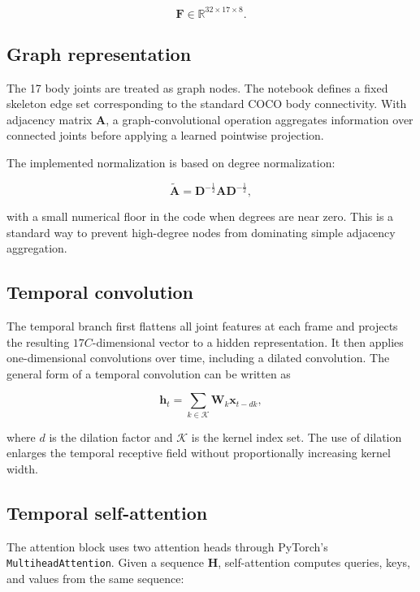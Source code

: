 \documentclass[11pt,a4paper]{article}
\newcommand{\code}[1]{\texttt{#1}}
\newcommand{\R}{\mathbb{R}}
\begin{document}
\begin{equation}
\mathbf{F}\in\R^{32\times17\times8}.
\end{equation}

\subsection{Graph representation}

The 17 body joints are treated as graph nodes. The notebook defines a fixed skeleton edge set corresponding to the standard COCO body connectivity. With adjacency matrix $\mathbf{A}$, a graph-convolutional operation aggregates information over connected joints before applying a learned pointwise projection.

The implemented normalization is based on degree normalization:

\begin{equation}
\widetilde{\mathbf{A}}
=
\mathbf{D}^{-\frac12}
\mathbf{A}
\mathbf{D}^{-\frac12},
\end{equation}

with a small numerical floor in the code when degrees are near zero. This is a standard way to prevent high-degree nodes from dominating simple adjacency aggregation.

\subsection{Temporal convolution}

The temporal branch first flattens all joint features at each frame and projects the resulting $17C$-dimensional vector to a hidden representation. It then applies one-dimensional convolutions over time, including a dilated convolution. The general form of a temporal convolution can be written as

\begin{equation}
\mathbf{h}_t
=
\sum_{k\in\mathcal{K}}
\mathbf{W}_k
\mathbf{x}_{t-dk},
\end{equation}

where $d$ is the dilation factor and $\mathcal{K}$ is the kernel index set. The use of dilation enlarges the temporal receptive field without proportionally increasing kernel width.

\subsection{Temporal self-attention}

The attention block uses two attention heads through PyTorch's \code{MultiheadAttention}. Given a sequence $\mathbf{H}$, self-attention computes queries, keys, and values from the same sequence:
\end{document}
